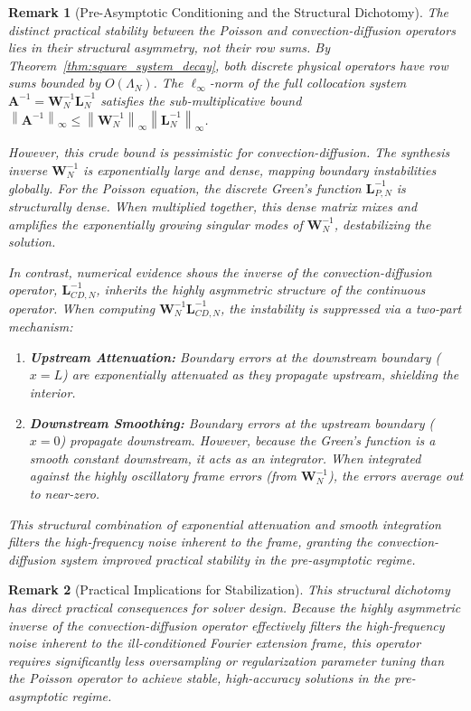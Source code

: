 \documentclass[pdflatex,sn-mathphys-num]{sn-jnl}%
\theoremstyle{thmstyleone}%
\newtheorem{remark}{Remark}
\newcommand{\norm}[1]{\left\lVert#1\right\rVert}
\newcommand{\mat}[1]{\mathbf{#1}}
\begin{document}
\begin{remark}[Pre-Asymptotic Conditioning and the Structural Dichotomy]
\label{rem:pre_asymptotic}
The distinct practical stability between the Poisson and convection-diffusion operators lies in their structural asymmetry, not their row sums.
By Theorem~\ref{thm:square_system_decay}, both discrete physical operators have row sums bounded by $O(\Lambda_N)$. The $\ell_\infty$-norm of the full collocation system $\mat{A}^{-1} = \mat{W}_N^{-1}\mat{L}_N^{-1}$ satisfies the sub-multiplicative bound $\norm{\mat{A}^{-1}}_\infty \le \norm{\mat{W}_N^{-1}}_\infty \norm{\mat{L}_N^{-1}}_\infty$. 

However, this crude bound is pessimistic for convection-diffusion. The synthesis inverse $\mat{W}_N^{-1}$ is exponentially large and dense, mapping boundary instabilities globally. For the Poisson equation, the discrete Green's function $\mat{L}_{P,N}^{-1}$ is structurally dense. When multiplied together, this dense matrix mixes and amplifies the exponentially growing singular modes of $\mat{W}_N^{-1}$, destabilizing the solution.

In contrast, numerical evidence shows the inverse of the convection-diffusion operator, $\mat{L}_{CD,N}^{-1}$, inherits the highly asymmetric structure of the continuous operator. When computing $\mat{W}_N^{-1}\mat{L}_{CD,N}^{-1}$, the instability is suppressed via a two-part mechanism:
\begin{enumerate}
    \item \textbf{Upstream Attenuation:} Boundary errors at the downstream boundary ($x=L$) are exponentially attenuated as they propagate upstream, shielding the interior.
    \item \textbf{Downstream Smoothing:} Boundary errors at the upstream boundary ($x=0$) propagate downstream. However, because the Green's function is a smooth constant downstream, it acts as an integrator. When integrated against the highly oscillatory frame errors (from $\mat{W}_N^{-1}$), the errors average out to near-zero.
\end{enumerate}

This structural combination of exponential attenuation and smooth integration filters the high-frequency noise inherent to the frame, granting the convection-diffusion system improved practical stability in the pre-asymptotic regime.
\end{remark}

\begin{remark}[Practical Implications for Stabilization]
This structural dichotomy has direct practical consequences for solver design. Because the highly asymmetric inverse of the convection-diffusion operator effectively filters the high-frequency noise inherent to the ill-conditioned Fourier extension frame, this operator requires significantly less oversampling or regularization parameter tuning than the Poisson operator to achieve stable, high-accuracy solutions in the pre-asymptotic regime.
\end{remark}
\end{document}
